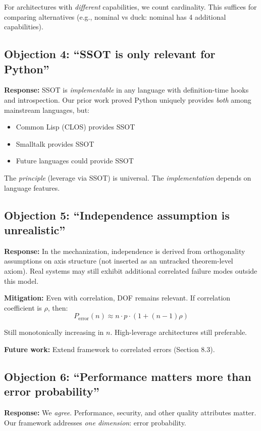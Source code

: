 For architectures with \emph{different} capabilities, we count cardinality. This suffices for comparing alternatives (e.g., nominal vs duck: nominal has 4 additional capabilities).

\subsection{Objection 4: ``SSOT is only relevant for Python''}

\textbf{Response:} SSOT is \emph{implementable} in any language with definition-time hooks and introspection. Our prior work proved Python uniquely provides \emph{both} among mainstream languages, but:
\begin{itemize}
\item Common Lisp (CLOS) provides SSOT
\item Smalltalk provides SSOT
\item Future languages could provide SSOT
\end{itemize}

The \emph{principle} (leverage via SSOT) is universal. The \emph{implementation} depends on language features.

\subsection{Objection 5: ``Independence assumption is unrealistic''}

\textbf{Response:} In the mechanization, independence is derived from orthogonality assumptions on axis structure (not inserted as an untracked theorem-level axiom). Real systems may still exhibit additional correlated failure modes outside this model.

\textbf{Mitigation:} Even with correlation, DOF remains relevant. If correlation coefficient is $\rho$, then:
\[
P_{\text{error}}(n) \approx n \cdot p \cdot (1 + (n-1)\rho)
\]

Still monotonically increasing in $n$. High-leverage architectures still preferable.

\textbf{Future work:} Extend framework to correlated errors (Section 8.3).

\subsection{Objection 6: ``Performance matters more than error probability''}

\textbf{Response:} We \emph{agree}. Performance, security, and other quality attributes matter. Our framework addresses \emph{one dimension}: error probability.

